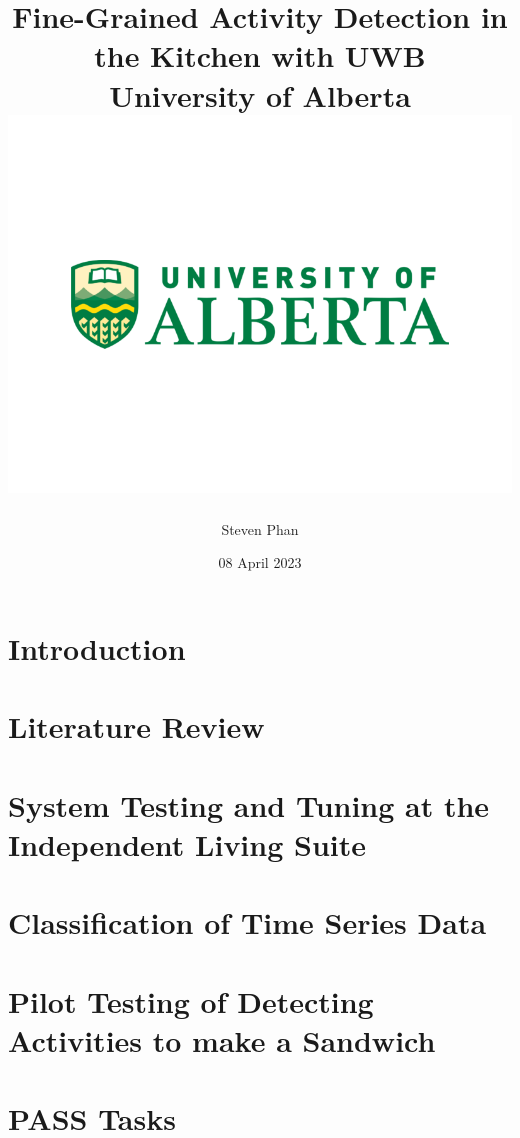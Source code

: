 \documentclass[12pt]{report}
\title{
    {Fine-Grained Activity Detection in the Kitchen with UWB}\\
    {\large University of Alberta}\\
    {\includegraphics[width=\textwidth]{university.png}}
}
\author{Steven Phan}
\date{08 April 2023}
\begin{document}
\maketitle


\tableofcontents

\chapter{Introduction}


\chapter{Literature Review}\label{chp2}


\chapter{System Testing and Tuning at the Independent Living Suite}\label{chp3}


\chapter{Classification of Time Series Data}\label{chp4}


\chapter{Pilot Testing of Detecting Activities to make a Sandwich}


\chapter{PASS Tasks}

% 



\end{document}
